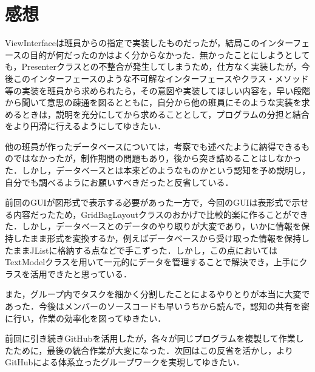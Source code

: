 \documentclass[12pt]{jarticle}
\begin{document}
\section{感想}
ViewInterfaceは班員からの指定で実装したものだったが，結局このインターフェースの目的が何だったのかはよく分からなかった．無かったことにしようとしても，Presenterクラスとの不整合が発生してしまうため，仕方なく実装したが，今後このインターフェースのような不可解なインターフェースやクラス・メソッド等の実装を班員から求められたら，その意図や実装してほしい内容を，早い段階から聞いて意思の疎通を図るとともに，自分から他の班員にそのような実装を求めるときは，説明を充分にしてから求めることとして，プログラムの分担と結合をより円滑に行えるようにしてゆきたい．

他の班員が作ったデータベースについては，考察でも述べたように納得できるものではなかったが，制作期間の問題もあり，後から突き詰めることはしなかった．しかし，データベースとは本来どのようなものかという認知を予め説明し，自分でも調べるようにお願いすべきだったと反省している．

前回のGUIが図形式で表示する必要があった一方で，今回のGUIは表形式で示せる内容だったため，GridBagLayoutクラスのおかげで比較的楽に作ることができた．しかし，データベースとのデータのやり取りが大変であり，いかに情報を保持したまま形式を変換するか，例えばデータベースから受け取った情報を保持したままJListに格納する点などで手こずった．しかし，この点においてはTextModelクラスを用いて一元的にデータを管理することで解決でき，上手にクラスを活用できたと思っている．

また，グループ内でタスクを細かく分割したことによるやりとりが本当に大変であった．今後はメンバーのソースコードも早いうちから読んで，認知の共有を密に行い，作業の効率化を図ってゆきたい．

前回に引き続きGitHubを活用したが，各々が同じプログラムを複製して作業したために，最後の統合作業が大変になった．次回はこの反省を活かし，よりGitHubによる体系立ったグループワークを実現してゆきたい．
\end{document}
